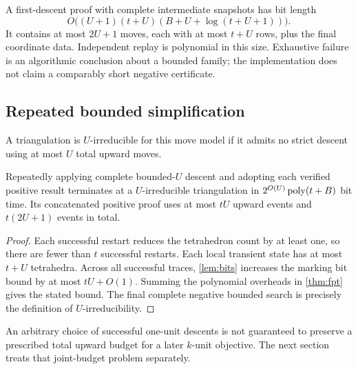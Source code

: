 A first-descent proof with complete intermediate snapshots has bit length
\begin{equation}\label{eq:certificate-size}
 O\bigl((U+1)(t+U)(B+U+\log(t+U+1))\bigr).
\end{equation}
It contains at most $2U+1$ moves, each with at most $t+U$ rows, plus the
final coordinate data. Independent replay is polynomial in this size.
Exhaustive failure is an algorithmic conclusion about a bounded family;
the implementation does not claim a comparably short negative certificate.

\subsection{Repeated bounded simplification}

\begin{definition}
A triangulation is $U$-irreducible for this move model if it admits no
strict descent using at most $U$ total upward moves.
\end{definition}

\begin{corollary}\label{cor:preprocess}
Repeatedly applying complete bounded-$U$ descent and adopting each verified
positive result terminates at a $U$-irreducible triangulation in
$2^{O(U)}\operatorname{poly}(t+B)$ bit time. Its concatenated positive proof uses at most
$tU$ upward events and $t(2U+1)$ events in total.
\end{corollary}
\begin{proof}
Each successful restart reduces the tetrahedron count by at least one,
so there are fewer than $t$ successful restarts. Each local transient state
has at most $t+U$ tetrahedra. Across all successful traces, \cref{lem:bits}
increases the marking bit bound by at most $tU+O(1)$. Summing the polynomial
overheads in \cref{thm:fpt} gives the stated bound. The final complete
negative bounded search is precisely the definition of $U$-irreducibility.
\end{proof}

An arbitrary choice of successful one-unit descents is not guaranteed to
preserve a prescribed total upward budget for a later $k$-unit objective.
The next section treats that joint-budget problem separately.
